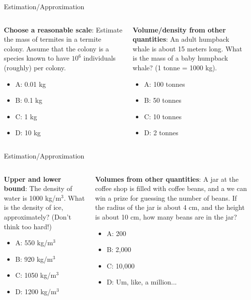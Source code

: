 \documentclass{beamer}
\begin{document}
\begin{frame}{Estimation/Approximation}
\small
\begin{columns}[T]
\begin{column}{0.5\textwidth}
\textbf{Choose a reasonable scale}: Estimate the mass of termites in a termite colony.  Assume that the colony is a species known to have $10^6$ individuals (roughly) per colony.
\begin{itemize}
\item A: 0.01 kg
\item B: 0.1 kg
\item C: 1 kg
\item D: 10 kg
\end{itemize}
\end{column}
\begin{column}{0.5\textwidth}
\textbf{Volume/density from other quantities}: An adult humpback whale is about 15 meters long.  What is the mass of a baby humpback whale? (1 tonne = 1000 kg).
\vspace{0.55cm}
\begin{itemize}
\item A: 100 tonnes
\item B: 50 tonnes
\item C: 10 tonnes
\item D: 2 tonnes
\end{itemize}
\end{column}
\end{columns}
\end{frame}

\begin{frame}{Estimation/Approximation}
\small
\begin{columns}[T]
\begin{column}{0.5\textwidth}
\textbf{Upper and lower bound}: The density of water is 1000 kg/m$^3$.  What is the density of ice, approximately?  (Don't think too hard!)
\begin{itemize}
\item A: 550 kg/m$^3$
\item B: 920 kg/m$^3$
\item C: 1050 kg/m$^3$
\item D: 1200 kg/m$^3$
\end{itemize}
\end{column}
\begin{column}{0.5\textwidth}
\textbf{Volumes from other quantities}: A jar at the coffee shop is filled with coffee beans, and a we can win a prize for guessing the number of beans.  If the radius of the jar is about 4 cm, and the height is about 10 cm, how many beans are in the jar?
\vspace{0.55cm}
\begin{itemize}
\item A: 200
\item B: 2,000
\item C: 10,000
\item D: Um, like, a million...
\end{itemize}
\end{column}
\end{columns}
\end{frame}
\end{document}

